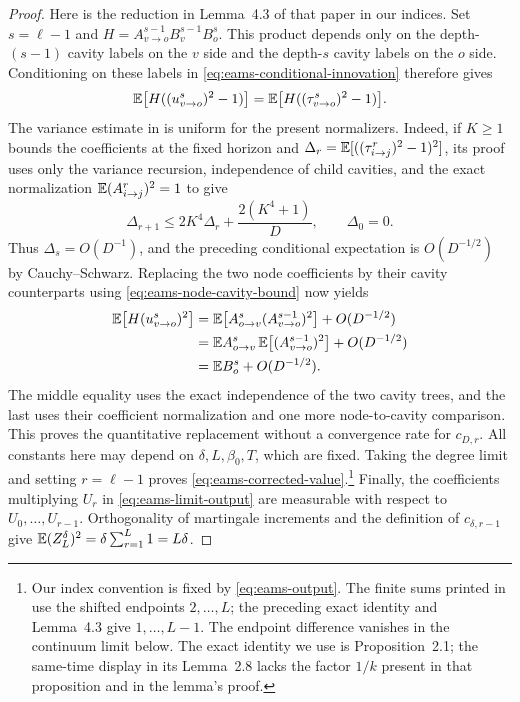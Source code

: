 \begin{proof}
Here is the reduction in Lemma~4.3 of that paper in our indices.
Set $s=\ell-1$ and
$H=A_{v\to o}^{s-1}B_v^{s-1}B_o^s$. This product depends only on
the depth-$(s-1)$ cavity labels on the $v$ side and the depth-$s$
cavity labels on the $o$ side. Conditioning on these labels in
\eqref{eq:eams-conditional-innovation} therefore gives
\[
 \mathbb E\bigl[H((u_{v\to o}^s)^2-1)\bigr]
 =\mathbb E\bigl[H((\tau_{v\to o}^s)^2-1)\bigr].
\]
The variance estimate in \cite[Lemmas~3.2--3.4]{EAMS2023} is uniform
for the present normalizers. Indeed, if $K\ge1$ bounds the
coefficients at the fixed horizon and
$\Delta_r=\mathbb E[((\tau^r_{i\to j})^2-1)^2]$, its proof uses only
the variance recursion, independence of child cavities, and the exact
normalization $\mathbb E(A^r_{i\to j})^2=1$ to give
\[
 \Delta_{r+1}\le2K^4\Delta_r+\frac{2(K^4+1)}D,
 \qquad \Delta_0=0.
\]
Thus $\Delta_s=O(D^{-1})$, and the preceding conditional expectation
is $O(D^{-1/2})$ by Cauchy--Schwarz. Replacing the two node
coefficients by their cavity counterparts using
\eqref{eq:eams-node-cavity-bound} now yields
\begin{align*}
 \mathbb E\bigl[H(u_{v\to o}^s)^2\bigr]
 &=\mathbb E\bigl[A_{o\to v}^s(A_{v\to o}^{s-1})^2\bigr]
       +O(D^{-1/2})\\
 &=\mathbb E A_{o\to v}^s\,\mathbb E\bigl[(A_{v\to o}^{s-1})^2\bigr]
       +O(D^{-1/2})\\
 &=\mathbb E B_o^s+O(D^{-1/2}).
\end{align*}
The middle equality uses the exact independence of the two cavity
trees, and the last uses their coefficient normalization and one
more node-to-cavity comparison. This proves the quantitative
replacement without a convergence rate for $c_{D,r}$.
All constants here may depend on $\delta,L,\beta_0,T$, which are fixed.
Taking the degree limit and setting $r=\ell-1$
proves \eqref{eq:eams-corrected-value}.\footnote{Our index convention
is fixed by \eqref{eq:eams-output}.  The finite sums printed in
\cite[(4.5), (4.18)]{EAMS2023} use the shifted endpoints $2,\ldots,L$;
the preceding exact identity and Lemma~4.3 give $1,\ldots,L-1$.
The endpoint difference vanishes in the continuum limit below.
The exact identity we use is Proposition~2.1; the same-time display
in its Lemma~2.8 lacks the factor $1/k$ present in that proposition
and in the lemma's proof.}
Finally, the coefficients multiplying $U_r$ in
\eqref{eq:eams-limit-output} are measurable with respect to
$U_0,\ldots,U_{r-1}$.  Orthogonality of martingale increments and the
definition of $c_{\delta,r-1}$ give
$\mathbb E(Z^\delta_L)^2=\delta\sum_{r=1}^L1=L\delta$.
\end{proof}

